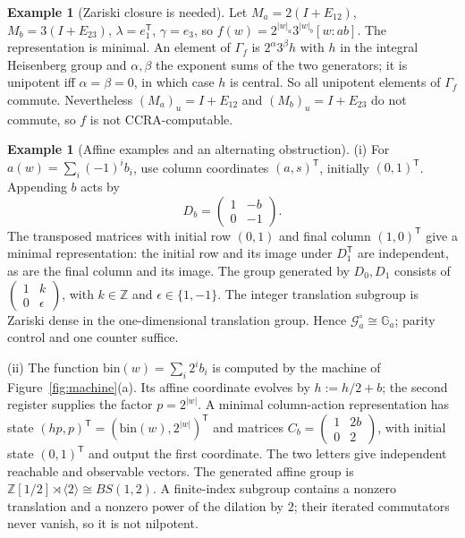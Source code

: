 \documentclass[11pt,letterpaper]{article}
\newcommand{\Z}{\mathbb{Z}}
\newcommand{\cG}{\mathcal{G}}
\newcommand{\bin}{\mathrm{bin}}
\theoremstyle{definition}
\newtheorem{example}[theorem]{Example}
\begin{document}
\begin{example}[Zariski closure is needed]\label{ex:heis}
Let $M_a=2(I+E_{12})$, $M_b=3(I+E_{23})$, $\lambda=e_1^{\mathsf T}$, $\gamma=e_3$, so $f(w)=2^{|w|_a}3^{|w|_b}[w:ab]$. The representation is minimal. An element of $\Gamma_f$ is $2^\alpha3^\beta h$ with $h$ in the integral Heisenberg group and $\alpha,\beta$ the exponent sums of the two generators; it is unipotent iff $\alpha=\beta=0$, in which case $h$ is central. So all unipotent elements of $\Gamma_f$ commute. Nevertheless $(M_a)_u=I+E_{12}$ and $(M_b)_u=I+E_{23}$ do not commute, so $f$ is not CCRA-computable.
\end{example}

\begin{example}[Affine examples and an alternating obstruction]\label{ex:positive}
(i) For $a(w)=\sum_i(-1)^i b_i$, use column coordinates $(a,s)^{\mathsf T}$, initially $(0,1)^{\mathsf T}$. Appending $b$ acts by
\[
D_b=\begin{pmatrix}1&-b\\0&-1\end{pmatrix}.
\]
The transposed matrices with initial row $(0,1)$ and final column $(1,0)^{\mathsf T}$ give a minimal representation: the initial row and its image under $D_1^{\mathsf T}$ are independent, as are the final column and its image. The group generated by $D_0,D_1$ consists of $\left(\begin{smallmatrix}1&k\\0&\epsilon\end{smallmatrix}\right)$, with $k\in\Z$ and $\epsilon\in\{1,-1\}$. The integer translation subgroup is Zariski dense in the one-dimensional translation group. Hence $\cG_a^\circ\cong\mathbb G_a$; parity control and one counter suffice.

(ii) The function $\bin(w)=\sum_i2^ib_i$ is computed by the machine of Figure~\ref{fig:machine}(a). Its affine coordinate evolves by $h:=h/2+b$; the second register supplies the factor $p=2^{|w|}$. A minimal column-action representation has state $(hp,p)^{\mathsf T}=(\bin(w),2^{|w|})^{\mathsf T}$ and matrices $C_b=\left(\begin{smallmatrix}1&2b\\0&2\end{smallmatrix}\right)$, with initial state $(0,1)^{\mathsf T}$ and output the first coordinate. The two letters give independent reachable and observable vectors. The generated affine group is $\Z[1/2]\rtimes\langle2\rangle\cong BS(1,2)$. A finite-index subgroup contains a nonzero translation and a nonzero power of the dilation by $2$; their iterated commutators never vanish, so it is not nilpotent.


\end{example}
\end{document}
